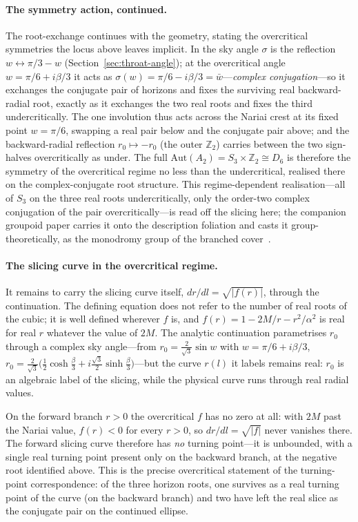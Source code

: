 \documentclass[11pt,a4paper]{article}
\theoremstyle{definition}
\begin{document}
\paragraph{The symmetry action, continued.} The root-exchange continues with the geometry, stating the overcritical symmetries the locus above leaves implicit. In the sky angle $\sigma$ is the reflection $w\leftrightarrow\pi/3-w$ (Section~\ref{sec:throat-angle}); at the overcritical angle $w=\pi/6+i\beta/3$ it acts as $\sigma(w)=\pi/6-i\beta/3=\bar w$---\emph{complex conjugation}---so it exchanges the conjugate pair of horizons and fixes the surviving real backward-radial root, exactly as it exchanges the two real roots and fixes the third undercritically. The one involution thus acts across the Nariai crest at its fixed point $w=\pi/6$, swapping a real pair below and the conjugate pair above; and the backward-radial reflection $r_{0}\mapsto-r_{0}$ (the outer $\mathbb{Z}_{2}$) carries between the two sign-halves overcritically as under. The full $\mathrm{Aut}(A_{2})=S_{3}\times\mathbb{Z}_{2}\cong D_{6}$ is therefore the symmetry of the overcritical regime no less than the undercritical, realised there on the complex-conjugate root structure. This regime-dependent realisation---all of $S_{3}$ on the three real roots undercritically, only the order-two complex conjugation of the pair overcritically---is read off the slicing here; the companion groupoid paper carries it onto the description foliation and casts it group-theoretically, as the monodromy group of the branched cover~\cite{JanzenGroupoid}.

\paragraph{The slicing curve in the overcritical regime.} It remains to carry the slicing curve itself, $dr/dl=\sqrt{|f(r)|}$, through the continuation. The defining equation does not refer to the number of real roots of the cubic; it is well defined wherever $f$ is, and $f(r)=1-2M/r-r^{2}/\alpha^{2}$ is real for real $r$ whatever the value of $2M$. The analytic continuation parametrises $r_{0}$ through a complex sky angle---from $r_{0}=\tfrac{2}{\sqrt3}\sin w$ with $w=\pi/6+i\beta/3$, $r_{0}=\tfrac{2}{\sqrt3}\bigl(\tfrac12\cosh\tfrac{\beta}{3}+i\tfrac{\sqrt3}{2}\sinh\tfrac{\beta}{3}\bigr)$---but the curve $r(l)$ it labels remains real: $r_{0}$ is an algebraic label of the slicing, while the physical curve runs through real radial values.

On the forward branch $r>0$ the overcritical $f$ has no zero at all: with $2M$ past the Nariai value, $f(r)<0$ for every $r>0$, so $dr/dl=\sqrt{|f|}$ never vanishes there. The forward slicing curve therefore has \emph{no} turning point---it is unbounded, with a single real turning point present only on the backward branch, at the negative root identified above. This is the precise overcritical statement of the turning-point correspondence: of the three horizon roots, one survives as a real turning point of the curve (on the backward branch) and two have left the real slice as the conjugate pair on the continued ellipse.
\end{document}
